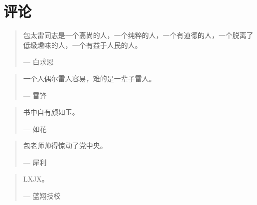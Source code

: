 \chapter{评论}

\begin{quotation}
包太雷同志是一个高尚的人，一个纯粹的人，一个有道德的人，一个脱离了低级趣味的人，一个有益于人民的人。
\begin{flushright}
    --- 白求恩
\end{flushright}
\end{quotation}

\begin{quotation}
一个人偶尔雷人容易，难的是一辈子雷人。
\begin{flushright}
    --- 雷锋
\end{flushright}
\end{quotation}

\begin{quotation}
书中自有颜如玉。
\begin{flushright}
    --- 如花
\end{flushright}
\end{quotation}

\begin{quotation}
包老师帅得惊动了党中央。
\begin{flushright}
    --- 犀利
\end{flushright}
\end{quotation}

\begin{quotation}
LXJX。
\begin{flushright}
    --- 蓝翔技校
\end{flushright}
\end{quotation}
